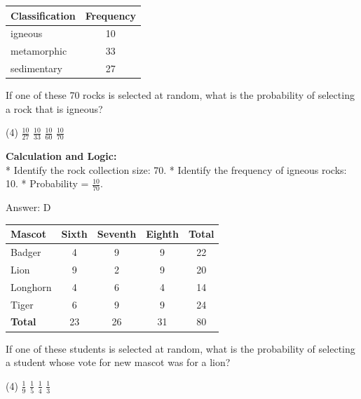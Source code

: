 \documentclass[11pt,paper=a4,answers]{exam}
\begin{document}
\begin{questions}
\question
\begin{center}
\begin{tabular}{|l|c|}
\hline
\textbf{Classification} & \textbf{Frequency} \\ \hline
igneous & 10 \\ \hline
metamorphic & 33 \\ \hline
sedimentary & 27 \\ \hline
\end{tabular}
\end{center}
If one of these 70 rocks is selected at random, what is the probability of selecting a rock that is igneous?
\begin{tasks}(4)
    \task $\frac{10}{27}$
    \task $\frac{10}{33}$
    \task $\frac{10}{60}$
    \task $\frac{10}{70}$
\end{tasks}

\begin{solution}
\textbf{Calculation and Logic:} \\
* Identify the rock collection size: 70.
* Identify the frequency of igneous rocks: 10.
* Probability = $\frac{10}{70}$.

\vspace{30pt}

Answer: \colorbox{yellow!100}{D}
\end{solution}

\vspace{60pt}

\question
\begin{center}
\begin{tabular}{|l|c|c|c|c|}
\hline
\textbf{Mascot} & \textbf{Sixth} & \textbf{Seventh} & \textbf{Eighth} & \textbf{Total} \\ \hline
Badger & 4 & 9 & 9 & 22 \\ \hline
Lion & 9 & 2 & 9 & 20 \\ \hline
Longhorn & 4 & 6 & 4 & 14 \\ \hline
Tiger & 6 & 9 & 9 & 24 \\ \hline
\textbf{Total} & 23 & 26 & 31 & 80 \\ \hline
\end{tabular}
\end{center}
If one of these students is selected at random, what is the probability of selecting a student whose vote for new mascot was for a lion?
\begin{tasks}(4)
    \task $\frac{1}{9}$
    \task $\frac{1}{5}$
    \task $\frac{1}{4}$
    \task $\frac{1}{3}$
\end{tasks}


\end{questions}
\end{document}
